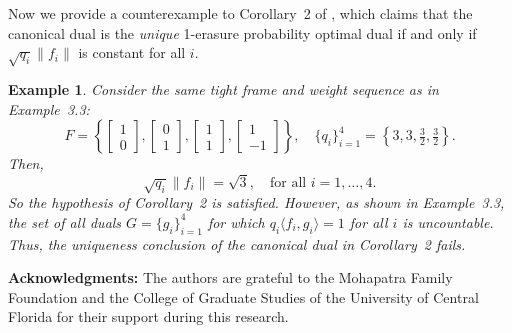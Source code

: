 \documentclass[final,1p,times]{elsarticle}
\newtheorem{example}[thm]{Example}
\begin{document}
Now we provide a counterexample to Corollary~2 of \cite{li1}, which claims that the canonical dual is the \emph{unique} 1-erasure probability optimal dual if and only if $\sqrt{q_i} \|f_i\|$ is constant for all $i$.

\begin{example}
Consider the same tight frame and weight sequence as in Example~3.3:
\[
F = \left\{ 
\begin{bmatrix}1\\0\end{bmatrix}, 
\begin{bmatrix}0\\1\end{bmatrix}, 
\begin{bmatrix}1\\1\end{bmatrix}, 
\begin{bmatrix}1\\-1\end{bmatrix}
\right\}, \quad 
\{q_i\}_{i=1}^4 = \left\{3, 3, \tfrac{3}{2}, \tfrac{3}{2} \right\}.
\]
Then,
\[
\sqrt{q_i} \|f_i\| = \sqrt{3}, \quad \text{for all } i=1,\dots,4.
\]
So the hypothesis of Corollary~2 is satisfied. However, as shown in Example~3.3, the set of all duals $G = \{g_i\}_{i=1}^4$ for which $q_i \langle f_i, g_i \rangle = 1$ for all $i$ is uncountable. Thus, the uniqueness conclusion of the canonical dual in Corollary~2 fails.
\end{example}




\vspace{1cm}





\noindent
	{\bf Acknowledgments:} 
	The authors are grateful to the Mohapatra Family Foundation and the College of Graduate Studies of the University of Central Florida for their support during this research.
\end{document}
